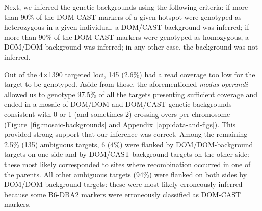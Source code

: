 


Next, we inferred the genetic backgrounds using the following criteria:
if more than 90\% of the DOM-CAST markers of a given hotspot were genotyped as heterozygous in a given individual, a DOM/CAST background was inferred;
if more than 90\% of the DOM-CAST markers were genotyped as homozygous, a DOM/DOM background was inferred;
in any other case, the background was not inferred.




Out of the 4$\times$1390 targeted loci, 145 (2.6\%) had a read coverage too low for the target to be genotyped.
Aside from those, the aforementioned \textit{modus operandi} allowed us to genotype 97.5\% of all the targets presenting sufficient coverage and ended in a mosaic of DOM/DOM and DOM/CAST genetic backgrounds consistent with 0 or 1 (and sometimes 2) crossing-overs per chromosome (Figure~\ref{fig:mosaic-backgrounds} and Appendix~\ref{app:data-and-figs}). 
This provided strong support that our inference was correct.
Among the remaining 2.5\% (135) ambiguous targets, 6 (4\%) were flanked by DOM/DOM-background targets on one side and by DOM/CAST-background targets on the other side: these most likely corresponded to sites where recombination occurred in one of the parents.
All other ambiguous targets (94\%) were flanked on both sides by DOM/DOM-background targets: these were most likely erroneously inferred because some B6-DBA2 markers were erroneously classified as DOM-CAST markers.

